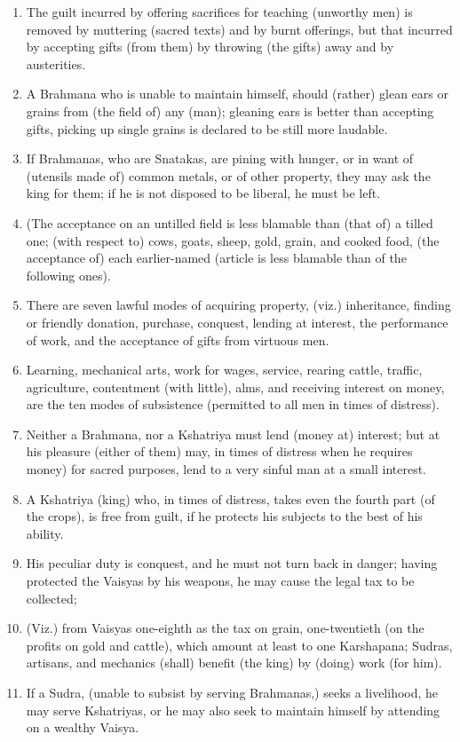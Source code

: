 \begin{enumerate}
\item The guilt incurred by offering sacrifices for teaching (unworthy men) is removed by muttering (sacred texts) and by burnt offerings, but that incurred by accepting gifts (from them) by throwing (the gifts) away and by austerities.
\item A Brahmana who is unable to maintain himself, should (rather) glean ears or grains from (the field of) any (man); gleaning ears is better than accepting gifts, picking up single grains is declared to be still more laudable.
\item If Brahmanas, who are Snatakas, are pining with hunger, or in want of (utensils made of) common metals, or of other property, they may ask the king for them; if he is not disposed to be liberal, he must be left.
\item (The acceptance on an untilled field is less blamable than (that of) a tilled one; (with respect to) cows, goats, sheep, gold, grain, and cooked food, (the acceptance of) each earlier-named (article is less blamable than of the following ones).
\item There are seven lawful modes of acquiring property, (viz.) inheritance, finding or friendly donation, purchase, conquest, lending at interest, the performance of work, and the acceptance of gifts from virtuous men.
\item Learning, mechanical arts, work for wages, service, rearing cattle, traffic, agriculture, contentment (with little), alms, and receiving interest on money, are the ten modes of subsistence (permitted to all men in times of distress).
\item Neither a Brahmana, nor a Kshatriya must lend (money at) interest; but at his pleasure (either of them) may, in times of distress when he requires money) for sacred purposes, lend to a very sinful man at a small interest.
\item A Kshatriya (king) who, in times of distress, takes even the fourth part (of the crops), is free from guilt, if he protects his subjects to the best of his ability.
\item His peculiar duty is conquest, and he must not turn back in danger; having protected the Vaisyas by his weapons, he may cause the legal tax to be collected;
\item (Viz.) from Vaisyas one-eighth as the tax on grain, one-twentieth (on the profits on gold and cattle), which amount at least to one Karshapana; Sudras, artisans, and mechanics (shall) benefit (the king) by (doing) work (for him).
\item If a Sudra, (unable to subsist by serving Brahmanas,) seeks a livelihood, he may serve Kshatriyas, or he may also seek to maintain himself by attending on a wealthy Vaisya.

\end{enumerate}
